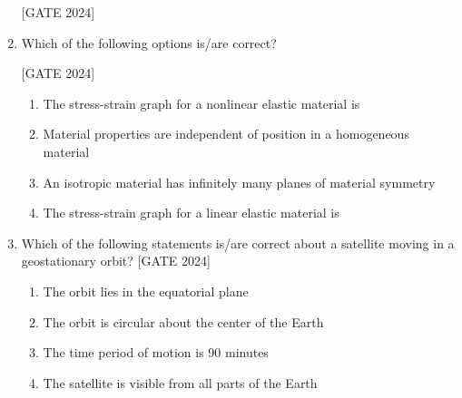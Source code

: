 \documentclass[journal,12pt,onecolumn]{IEEEtran}
\theoremstyle{remark}
\begin{document}
\begin{enumerate}
        \hfill{[GATE 2024]}\begin{enumerate}   \end{enumerate}
    
\item Which of the following options is/are correct?
    
        \hfill{[GATE 2024]}\begin{enumerate}
            \item The stress-strain graph for a nonlinear elastic material is 
            \item Material properties are independent of position in a homogeneous material
            \item An isotropic material has infinitely many planes of material symmetry
            \item The stress-strain graph for a linear elastic material is
            \end{enumerate}
         
\item Which of the following statements is/are correct about a satellite moving in a
geostationary orbit?
          \hfill{[GATE 2024]}\begin{enumerate}
              \item The orbit lies in the equatorial plane
\item The orbit is circular about the center of the Earth
\item The time period of motion is 90 minutes
\item The satellite is visible from all parts of the Earth
          \end{enumerate}
\end{enumerate}
\end{document}
